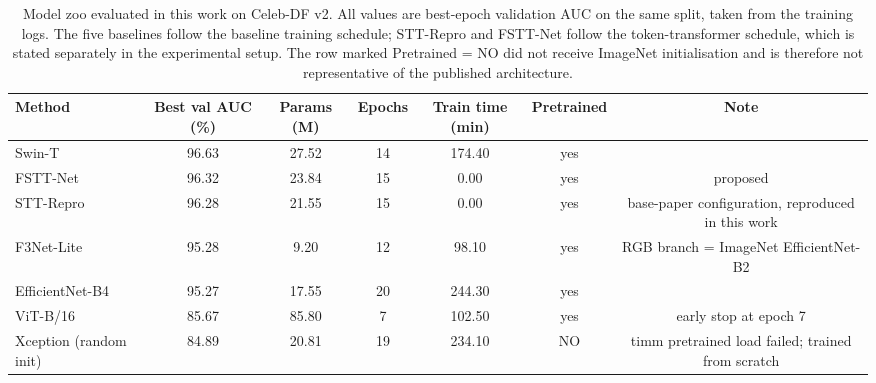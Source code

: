 \begin{table}[!t]
\centering
\caption{Model zoo evaluated in this work on Celeb-DF v2. All values are best-epoch validation AUC on the same split, taken from the training logs. The five baselines follow the baseline training schedule; STT-Repro and FSTT-Net follow the token-transformer schedule, which is stated separately in the experimental setup. The row marked Pretrained = NO did not receive ImageNet initialisation and is therefore not representative of the published architecture.}
\label{tab:tableIII_model_zoo}
\footnotesize
\begin{tabular}{lcccccc}
\hline\hline
Method & Best val AUC (\%) & Params (M) & Epochs & Train time (min) & Pretrained & Note \\
\hline
Swin-T & 96.63 & 27.52 & 14 & 174.40 & yes &  \\
FSTT-Net & 96.32 & 23.84 & 15 & 0.00 & yes & proposed \\
STT-Repro & 96.28 & 21.55 & 15 & 0.00 & yes & base-paper configuration, reproduced in this work \\
F3Net-Lite & 95.28 & 9.20 & 12 & 98.10 & yes & RGB branch = ImageNet EfficientNet-B2 \\
EfficientNet-B4 & 95.27 & 17.55 & 20 & 244.30 & yes &  \\
ViT-B/16 & 85.67 & 85.80 & 7 & 102.50 & yes & early stop at epoch 7 \\
Xception (random init) & 84.89 & 20.81 & 19 & 234.10 & NO & timm pretrained load failed; trained from scratch \\
\hline\hline
\end{tabular}
\end{table}
